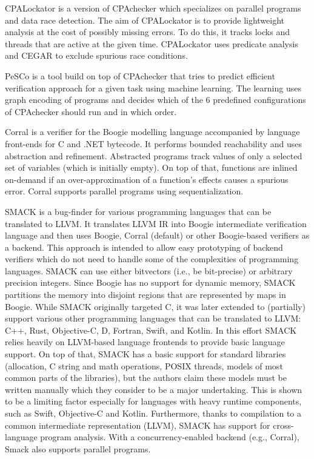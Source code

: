 CPALockator  is a version of CPAchecker which specializes on parallel programs and data race detection.
The aim of CPALockator is to provide lightweight analysis at the cost of possibly missing errors.
To do this, it tracks locks and threads that are active at the given time.
CPALockator uses predicate analysis and CEGAR to exclude spurious race conditions.

PeSCo  is a tool build on top of CPAchecker that tries to predict efficient verification approach for a given task using machine learning.
The learning uses graph encoding of programs and decides which of the 6 predefined configurations of CPAchecker should run and in which order.

Corral  is a verifier for the Boogie modelling language accompanied by language front-ends for C and .NET bytecode.
It performs bounded reachability and uses abstraction and refinement.
Abstracted programs track values of only a selected set of variables (which is initially empty).
On top of that, functions are inlined on-demand if an over-approximation of a function's effects causes a spurious error.
Corral supports parallel programs using sequentialization.

SMACK  is a bug-finder for various programming languages that can be translated to LLVM.
It translates LLVM IR into Boogie intermediate verification language and then uses Boogie, Corral (default) or other Boogie-based verifiers as a backend.
This approach is intended to allow easy prototyping of backend verifiers which do not need to handle some of the complexities of programming languages.
SMACK can use either bitvectors (i.e., be bit-precise) or arbitrary precision integers.
Since Boogie has no support for dynamic memory, SMACK partitions the memory into disjoint regions that are represented by maps in Boogie.
While SMACK originally targeted C, it was later extended to (partially) support various other programming languages that can be translated to LLVM: C++, Rust, Objective-C, D, Fortran, Swift, and Kotlin.
In this effort SMACK relies heavily on LLVM-based language frontends to provide basic language support.
On top of that, SMACK has a basic support for standard libraries (allocation, C string and math operations, POSIX threads, models of most common parts of the libraries), but the authors claim these models must be written manually which they consider to be a major undertaking.
This is shown to be a limiting factor especially for languages with heavy runtime components, such as Swift, Objective-C and Kotlin.
Furthermore, thanks to compilation to a common intermediate representation (LLVM), SMACK has support for cross-language program analysis.
With a concurrency-enabled backend (e.g., Corral), Smack also supports parallel programs.


